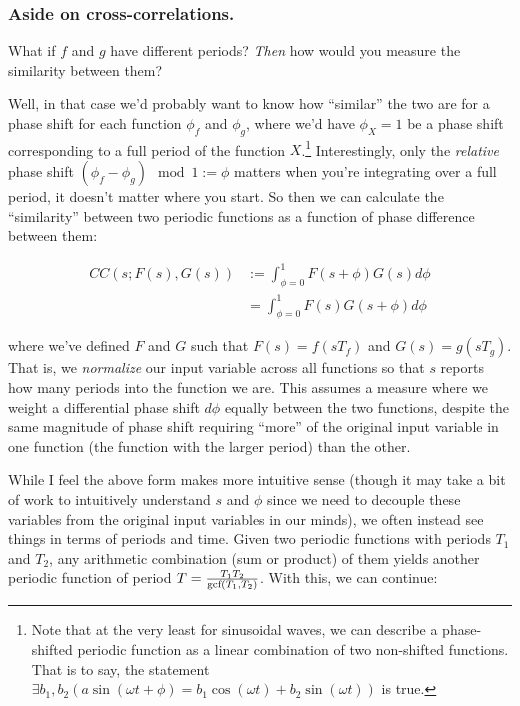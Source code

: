 \documentclass[../main/main.tex]{subfiles}
\begin{document}
\subsubsection{Aside on cross-correlations.}

What if \(f\) and \(g\) have different periods? 
\emph{Then} how would you measure the similarity between them?\par
Well, in that case we'd probably want to know how ``similar''
the two are for a phase shift for each function \(\phi_f\) and \(\phi_g\),
where we'd have \(\phi_X = 1\) be a phase shift corresponding to a full
period of the function \(X\).\footnote
{
  Note that at the very least for sinusoidal waves, we can
  describe a phase-shifted periodic function as a linear combination
  of two non-shifted functions. That is to say, the statement
  \(\exists b_1, b_2 \left(a\sin(\omega t + \phi) = b_1\cos(\omega t) + b_2\sin(\omega t)\right)\) is true.
}
Interestingly, only the \emph{relative} phase shift 
\(\left(\phi_f - \phi_g\right) \mod 1 := \phi \)
matters \textemdash{} when you're integrating over a full period,
it doesn't matter where you start.
So then we can calculate the ``similarity'' between two periodic
functions as a function of phase difference between them:

\[ \begin{split}
  CC(s; F(s), G(s)) &:= 
    \int_{\phi = 0}^{1} F(s + \phi) G(s) d\phi \\
    &= \int_{\phi = 0}^{1} F(s) G(s + \phi) d\phi
\end{split}
\]

where we've defined \(F\) and \(G\) such that 
\(F(s) = f(sT_f)\)
and
\(G(s) = g(sT_g)\). That is, we \emph{normalize} our input variable
across all functions so that \(s\) reports how many periods into
the function we are. 
This assumes a measure where we weight a differential phase shift
\(d\phi\) equally between the two functions, despite the same
magnitude of phase shift requiring ``more'' of the original
input variable in one function (the function with the larger period)
than the other.\par

While I feel the above form makes more intuitive sense (though
it may take a bit of work to intuitively understand \(s\) and \(\phi\) since
we need to decouple these variables from the original input variables
in our minds), 
we often
instead see things in terms of periods and time.
Given two periodic functions with periods \(T_1\) and \(T_2\),
any arithmetic combination (sum or product) of them yields
another periodic function of period \(T = \frac{T_1 T_2}{\text{gcf}\left(T_1, T_2\right)}\). With this, we can continue:
\end{document}
